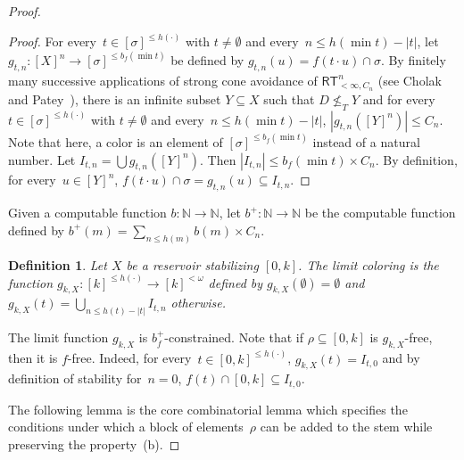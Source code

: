 \documentclass[10pt,a4paper]{article}
\newcommand{\RT}[0]{\mathsf{RT}}
\newcommand{\NN}[0]{\mathbb{N}}
\numberwithin{theorem}{section}
\newtheorem{lemma}[theorem]{Lemma}
\newtheorem{definition}[theorem]{Definition}
\begin{document}
\begin{proof}
\begin{proof}
For every~$t \in [\sigma]^{\leq h(\cdot)}$ with $t \neq \emptyset$ and every~$n \leq h(\min t) - |t|$, let $g_{t, n} : [X]^n \to [\sigma]^{\leq b_f(\min t)}$ be defined by $g_{t, n}(u) = f(t \cdot u) \cap \sigma$. By finitely many successive applications of strong cone avoidance of $\RT^n_{<\infty, C_n}$ (see Cholak and Patey~\cite{cholak2020thin}), there is an infinite subset $Y \subseteq X$ such that $D \not \leq_T Y$ and for every~$t \in [\sigma]^{\leq h(\cdot)}$ with $t \neq \emptyset$ and every~$n \leq h(\min t) - |t|$, $|g_{t, n}([Y]^n)| \leq C_n$. Note that here, a color is an element of $[\sigma]^{\leq b_f(\min t)}$ instead of a natural number. Let $I_{t, n} = \bigcup g_{t, n}([Y]^n)$. Then $|I_{t, n}| \leq b_f(\min t) \times C_n$. By definition, for every~$u \in [Y]^n$, $f(t \cdot u) \cap \sigma = g_{t, n}(u) \subseteq I_{t, n}$.
\end{proof}

Given a computable function $b : \NN \to \NN$, let $b ^{+} : \NN \to \NN$ be the computable function defined by  $b^{+}(m) = \sum_{n \leq h(m)} b(m) \times C_n$.

\begin{definition}
Let $X$ be a reservoir stabilizing $[0, k]$. The \emph{limit coloring} is the function $g_{k,X} : [k]^{\leq h(\cdot)} \to [k]^{<\omega}$ defined by $g_{k,X}(\emptyset) = \emptyset$ and $g_{k,X}(t) = \bigcup_{n \leq h(t) - |t|} I_{t, n}$ otherwise.
\end{definition}

The limit function $g_{k,X}$ is $b_f^{+}$-constrained. Note that if $\rho \subseteq [0, k]$ is $g_{k,X}$-free, then it is $f$-free. Indeed, for every~$t \in [0, k]^{\leq h(\cdot)}$, $g_{k,X}(t) = I_{t, 0}$ and by definition of stability for~$n = 0$, $f(t) \cap [0, k] \subseteq I_{t, 0}$.

The following lemma is the core combinatorial lemma which specifies the conditions under which a block of elements~$\rho$ can be added to the stem while preserving the property~(b).


\end{proof}
\end{document}
